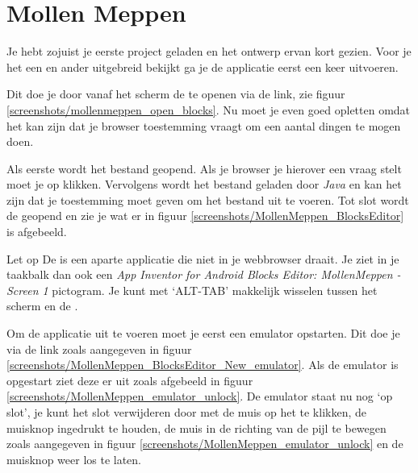 \chapter{Mollen Meppen}

Je hebt zojuist je eerste project geladen en het ontwerp ervan kort gezien. Voor je het een en ander uitgebreid bekijkt ga je de applicatie eerst een keer uitvoeren.

Dit doe je door vanaf het  scherm de  te openen via de  link, zie figuur \ref{screenshots/mollenmeppen_open_blocks}. Nu moet je even goed opletten omdat het kan zijn dat je browser toestemming vraagt om een aantal dingen te mogen doen.


Als eerste wordt het  bestand geopend. Als je browser je hierover een vraag stelt moet je op  klikken. Vervolgens wordt het bestand geladen door \emph{Java} en kan het zijn dat je toestemming moet geven om het bestand uit te voeren. Tot slot wordt de  geopend en zie je wat er in figuur \ref{screenshots/MollenMeppen_BlocksEditor} is afgebeeld.


\begin{derivation}{Let op}
De  is een aparte applicatie die niet in je webbrowser draait. Je ziet in je taakbalk dan ook een \emph{App Inventor for Android Blocks Editor: MollenMeppen - Screen 1} pictogram. Je kunt met `ALT-TAB' makkelijk wisselen tussen het  scherm en de .
\end{derivation}

Om de applicatie uit te voeren moet je eerst een emulator opstarten. Dit doe je via de  link zoals aangegeven in figuur \ref{screenshots/MollenMeppen_BlocksEditor_New_emulator}. Als de emulator is opgestart ziet deze er uit zoals afgebeeld in figuur \ref{screenshots/MollenMeppen_emulator_unlock}. De emulator staat nu nog `op slot', je kunt het slot verwijderen door met de muis op het  te klikken, de muisknop ingedrukt te houden, de muis in de richting van de pijl te bewegen zoals aangegeven in figuur \ref{screenshots/MollenMeppen_emulator_unlock} en de muisknop weer los te laten.


